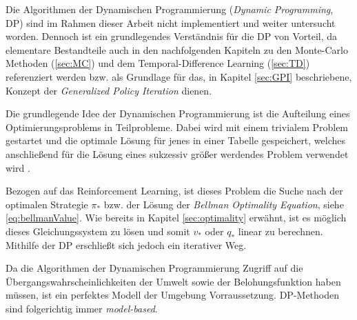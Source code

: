 Die Algorithmen der Dynamischen Programmierung (\textit{Dynamic Programming}, DP) sind im Rahmen dieser Arbeit nicht implementiert und weiter untersucht worden. Dennoch ist ein grundlegendes Verständnis für die DP von Vorteil, da elementare Bestandteile auch in den nachfolgenden Kapiteln zu den Monte-Carlo Methoden (\ref{sec:MC}) und dem Temporal-Difference Learning (\ref{sec:TD}) referenziert werden bzw. als Grundlage für das, in Kapitel \ref{sec:GPI} beschriebene, Konzept der \textit{Generalized Policy Iteration} dienen.
\par 
Die grundlegende Idee der Dynamischen Programmierung ist die Aufteilung eines Optimierungsproblems in Teilprobleme. Dabei wird mit einem trivialem Problem gestartet und die optimale Lösung für jenes in einer Tabelle gespeichert, welches anschließend für die Lösung eines sukzessiv größer werdendes Problem verwendet wird \cite[S.~243]{mehlhorn}.
\par 
Bezogen auf das Reinforcement Learning, ist dieses Problem die Suche nach der optimalen Strategie $\pi_*$ bzw. der Lösung der \textit{Bellman Optimality Equation}, siehe \ref{eq:bellmanValue}. Wie bereits in Kapitel \ref{sec:optimality} erwähnt, ist es möglich dieses Gleichungssystem zu lösen und somit $v_*$ oder $q_*$ linear zu berechnen. Mithilfe der DP erschließt sich jedoch ein iterativer Weg.
\par 
Da die Algorithmen der Dynamischen Programmierung Zugriff auf die Übergangswahrscheinlichkeiten der Umwelt sowie der Belohungsfunktion haben müssen, ist ein perfektes Modell der Umgebung Vorraussetzung. DP-Methoden sind folgerichtig immer \textit{model-based}.
\par

